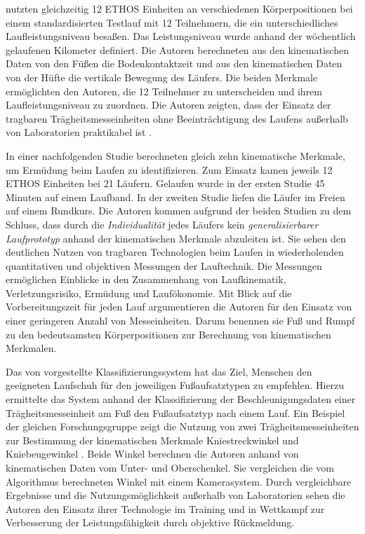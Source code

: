 \citet{Strohrmann2011} nutzten gleichzeitig 12 ETHOS Einheiten an verschiedenen Körperpositionen bei einem standardisierten Testlauf mit 12 Teilnehmern, die ein unterschiedliches Laufleistungsniveau besaßen. Das Leistungsniveau wurde anhand der wöchentlich gelaufenen Kilometer definiert. Die Autoren berechneten aus den kinematischen Daten von den Füßen die Bodenkontaktzeit und aus den kinematischen Daten von der Hüfte die vertikale Bewegung des Läufers. Die beiden Merkmale ermöglichten den Autoren, die 12 Teilnehmer zu unterscheiden und ihrem Laufleistungsniveau zu zuordnen. Die Autoren zeigten, dass der Einsatz der tragbaren Trägheitsmesseinheiten ohne Beeinträchtigung des Laufens außerhalb von Laboratorien praktikabel ist \citep{Strohrmann2011a}.

In einer nachfolgenden Studie berechneten \citet{Strohrmann2012} gleich zehn kinematische Merkmale, um Ermüdung beim Laufen zu identifizieren. Zum Einsatz kamen jeweils 12 ETHOS Einheiten bei 21 Läufern. Gelaufen wurde in der ersten Studie 45 Minuten auf einem Laufband. In der zweiten Studie liefen die Läufer im Freien auf einem Rundkurs. Die Autoren kommen aufgrund der beiden Studien zu dem Schluss, dass durch die \emph{Individualität} jedes Läufers kein \emph{generalisierbarer Laufprototyp} anhand der kinematischen Merkmale abzuleiten ist. Sie sehen den deutlichen Nutzen von tragbaren Technologien beim Laufen in wiederholenden quantitativen und objektiven Messungen der Lauftechnik. Die Messungen ermöglichen Einblicke in den Zusammenhang von Laufkinematik, Verletzungsrisiko, Ermüdung und Laufökonomie. Mit Blick auf die Vorbereitungszeit für jeden Lauf argumentieren die Autoren für den Einsatz von einer geringeren Anzahl von Messeinheiten. Darum benennen sie Fuß und Rumpf zu den bedeutsamsten Körperpositionen zur Berechnung von kinematischen Merkmalen.

Das von \citet{Eskofier2013} vorgestellte Klassifizierungssystem hat das Ziel, Menschen den geeigneten Laufschuh für den jeweiligen Fußaufsatztypen zu empfehlen. Hierzu ermittelte das System anhand der Klassifizierung der Beschleunigungsdaten einer Trägheitsmesseinheit am Fuß den Fußaufsatztyp nach einem Lauf. Ein Beispiel der gleichen Forschungsgruppe zeigt die Nutzung von zwei Trägheitsmesseinheiten zur Bestimmung der kinematischen Merkmale Kniestreckwinkel und Kniebeugewinkel \citep{Jakob2013}. Beide Winkel berechnen die Autoren anhand von kinematischen Daten vom Unter- und Oberschenkel. Sie vergleichen die vom Algorithmus berechneten Winkel mit einem Kamerasystem. Durch vergleichbare Ergebnisse und die Nutzungsmöglichkeit außerhalb von Laboratorien sehen die Autoren den Einsatz ihrer Technologie im Training und in Wettkampf zur Verbesserung der Leistungsfähigkeit durch objektive Rückmeldung.

